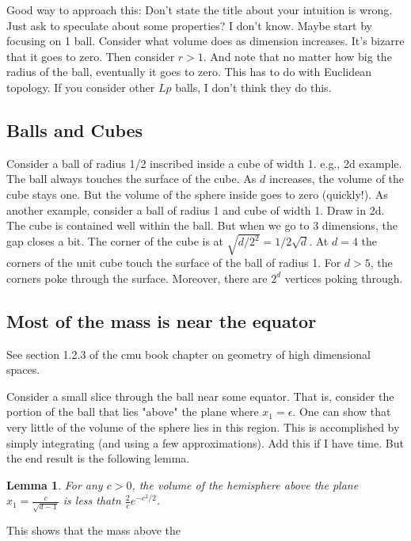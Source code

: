 \documentclass{book}
\newtheorem{lemma}{Lemma}
\begin{document}
Good way to approach this: Don't state the title about your intuition is wrong. Just ask to speculate about some properties? I don't know. Maybe start by focusing on 1 ball. Consider what volume does as dimension increases. It's bizarre that it goes to zero. Then consider $r>1$. And note that no matter how big the radius of the ball, eventually it goes to zero. This has to do with Euclidean topology. If you consider other $Lp$ balls, I don't think they do this. 



\subsection{Balls and Cubes}
Consider a ball of radius 1/2 inscribed inside a cube of width 1. e.g., 2d example. The ball always touches the surface of the cube. As $d$ increases, the volume of the cube stays one. But the volume of the sphere inside goes to zero (quickly!). As another example, consider a ball of radius 1 and cube of width 1. Draw in 2d. The cube is contained well within the ball. But when we go to 3 dimensions, the gap closes a bit. The corner of the cube is at $\sqrt{d/2^2} = 1/2\sqrt{d}$. At $d=4$ the corners of the unit cube touch the surface of the ball of radius 1. For $d>5$, the corners poke through the surface. Moreover, there are $2^d$ vertices poking through. 


\subsection{Most of the mass is near the equator}
See section 1.2.3 of the cmu book chapter on geometry of high dimensional spaces. 

Consider a small slice through the ball near some equator. That is, consider the portion of the ball that lies "above" the plane where $x_1 = \epsilon$. One can show that very little of the volume of the sphere lies in this region. This is accomplished by simply integrating (and using a few approximations). Add this if I have time. But the end result is the following lemma. 
\begin{lemma}
For any $c>0$, the volume of the hemisphere above the plane $x_1 = \frac{c}{\sqrt{d-1}}$ is less thatn $\frac{2}{c}e^{-c^2/2}$. 
\end{lemma}
This shows that the mass above the 
\end{document}
